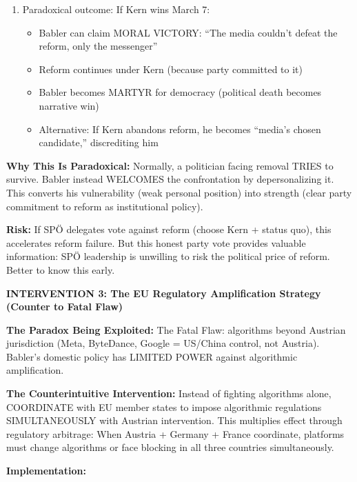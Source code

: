 \begin{enumerate}
\item Paradoxical outcome: If Kern wins March 7:
  \begin{itemize}
  \item Babler can claim MORAL VICTORY: ``The media couldn't defeat the reform, only the messenger''
  \item Reform continues under Kern (because party committed to it)
  \item Babler becomes MARTYR for democracy (political death becomes narrative win)
  \item Alternative: If Kern abandons reform, he becomes ``media's chosen candidate,'' discrediting him
  \end{itemize}

\end{enumerate}

\textbf{Why This Is Paradoxical:} Normally, a politician facing removal TRIES to survive. Babler instead
WELCOMES the confrontation by depersonalizing it. This converts his vulnerability (weak personal position)
into strength (clear party commitment to reform as institutional policy).

\textbf{Risk:} If SPÖ delegates vote against reform (choose Kern + status quo), this accelerates reform failure.
But this honest party vote provides valuable information: SPÖ leadership is unwilling to risk the political price
of reform. Better to know this early.

\vspace{0.5cm}

\textbf{INTERVENTION 3: The EU Regulatory Amplification Strategy (Counter to Fatal Flaw)}

\textbf{The Paradox Being Exploited:} The Fatal Flaw: algorithms beyond Austrian jurisdiction (Meta, ByteDance, Google
= US/China control, not Austria). Babler's domestic policy has LIMITED POWER against algorithmic amplification.

\textbf{The Counterintuitive Intervention:} Instead of fighting algorithms alone, COORDINATE with EU member states
to impose algorithmic regulations SIMULTANEOUSLY with Austrian intervention. This multiplies effect through
regulatory arbitrage: When Austria + Germany + France coordinate, platforms must change algorithms or face
blocking in all three countries simultaneously.

\textbf{Implementation:}

